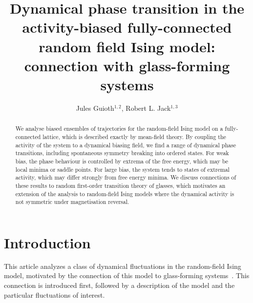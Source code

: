 \documentclass{iopart}
\begin{document}
\title[Dynamical phase transition in the activity-biased fully-connected RFIM]
{Dynamical phase transition in the activity-biased fully-connected random field Ising model: connection with glass-forming systems}
\author{Jules Guioth$^{1,2}$, Robert L. Jack$^{1, 3}$}
\address{$^1$ Department of Applied Mathematics and Theoretical Physics, University  of Cambridge, Wilberforce Road, Cambridge CB3 0WA, United Kingdom}
\address{$^2$ Univ. Lyon, \'{E}NS de Lyon, Univ. Claude Bernard, CNRS, Laboratoire de Physique, F-69342 Lyon, France}
\address{$^3$ Yusuf Hamied Department of Chemistry, University of Cambridge, Lensfield Road, Cambridge CB2 1EW, United Kingdom}


\begin{abstract}
We analyse biased ensembles of trajectories for the  random-field Ising model on a fully-connected lattice, which is described exactly by mean-field theory.  By coupling the activity of the system to a dynamical biasing field, we find a range of dynamical phase transitions, including spontaneous symmetry breaking into ordered states.  For weak bias, the phase behaviour is controlled by extrema of the free energy, which may be local minima or saddle points.  For large bias, the system tends to states of extremal activity, which may differ strongly from free energy minima.  We discuss connections of these results to random first-order transition theory of glasses, which motivates an extension of the analysis to random-field Ising models where the dynamical activity is not symmetric under magnetisation reversal.  
\end{abstract}


\section{Introduction}
\label{sec:glass}

This article analyzes a class of dynamical fluctuations in the random-field Ising model, motivated by the connection of this model to glass-forming systems~\cite{biroli2014random,biroli2018random1,biroli2018random2,franz2013glassy,franz2013universality}.
This connection is introduced first, followed by a description of the model and the particular fluctuations of interest.
\end{document}
